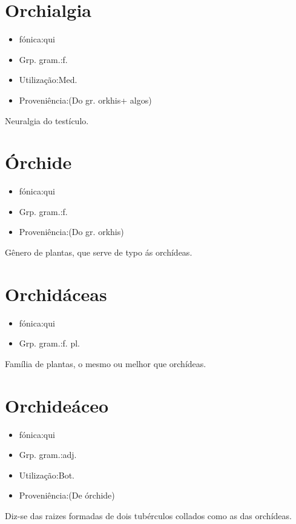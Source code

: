 \section{Orchialgia}
\begin{itemize}
\item {fónica:qui}
\end{itemize}
\begin{itemize}
\item {Grp. gram.:f.}
\end{itemize}
\begin{itemize}
\item {Utilização:Med.}
\end{itemize}
\begin{itemize}
\item {Proveniência:(Do gr. \textunderscore orkhis\textunderscore  + \textunderscore algos\textunderscore )}
\end{itemize}
Neuralgia do testículo.
\section{Órchide}
\begin{itemize}
\item {fónica:qui}
\end{itemize}
\begin{itemize}
\item {Grp. gram.:f.}
\end{itemize}
\begin{itemize}
\item {Proveniência:(Do gr. \textunderscore orkhis\textunderscore )}
\end{itemize}
Gênero de plantas, que serve de typo ás orchídeas.
\section{Orchidáceas}
\begin{itemize}
\item {fónica:qui}
\end{itemize}
\begin{itemize}
\item {Grp. gram.:f. pl.}
\end{itemize}
Família de plantas, o mesmo ou melhor que \textunderscore orchídeas\textunderscore .
\section{Orchideáceo}
\begin{itemize}
\item {fónica:qui}
\end{itemize}
\begin{itemize}
\item {Grp. gram.:adj.}
\end{itemize}
\begin{itemize}
\item {Utilização:Bot.}
\end{itemize}
\begin{itemize}
\item {Proveniência:(De \textunderscore órchide\textunderscore )}
\end{itemize}
Diz-se das raizes formadas de dois tubérculos collados como as das orchídeas.
